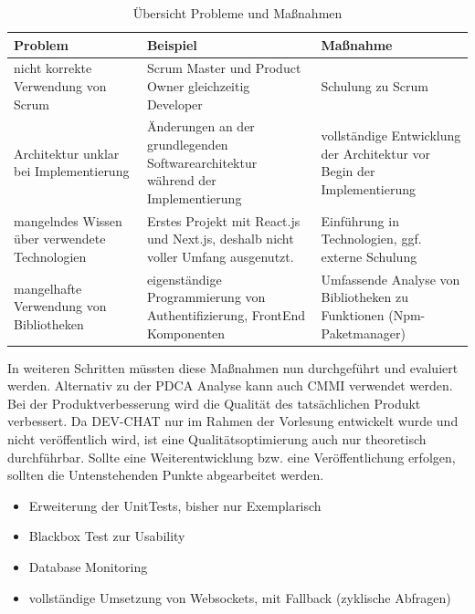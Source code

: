 \begin{table}[H]
    \begin{tabular}{l|l|l}
    Problem                                        &Beispiel                                                                         & Maßnahme                                                               \\ \hline
    nicht korrekte Verwendung von Scrum            & Scrum Master und Product Owner gleichzeitig Developer                            & Schulung zu Scrum                                                      \\\hline
    Architektur unklar bei Implementierung         & Änderungen an der grundlegenden Softwarearchitektur während der Implementierung  & vollständige Entwicklung der Architektur vor Begin der Implementierung \\\hline
    mangelndes Wissen über verwendete Technologien & Erstes Projekt mit React.js und Next.js, deshalb nicht voller Umfang ausgenutzt. & Einführung in Technologien, ggf. externe Schulung                      \\\hline
    mangelhafte Verwendung von Bibliotheken        & eigenständige Programmierung von Authentifizierung, FrontEnd Komponenten         & Umfassende Analyse von Bibliotheken zu Funktionen (Npm-Paketmanager)  
    \end{tabular}
    \caption{Übersicht Probleme und Maßnahmen}
    \label{tab:pdca}
\end{table}\noindent
In weiteren Schritten müssten diese Maßnahmen nun durchgeführt und evaluiert werden.
Alternativ zu der PDCA Analyse kann auch \ac{CMMI} verwendet werden.
\newparagraph
Bei der Produktverbesserung wird die Qualität des tatsächlichen Produkt verbessert.
Da DEV-CHAT nur im Rahmen der Vorlesung entwickelt wurde und nicht veröffentlich wird, ist eine Qualitätsoptimierung auch nur theoretisch durchführbar. 
Sollte eine Weiterentwicklung bzw. eine Veröffentlichung erfolgen, sollten die Untenstehenden Punkte abgearbeitet werden.
\begin{itemize}
    \item Erweiterung der UnitTests, bisher nur Exemplarisch
    \item Blackbox Test zur Usability
    \item Database Monitoring
    \item vollständige Umsetzung von Websockets, mit Fallback (zyklische Abfragen)
\end{itemize}


